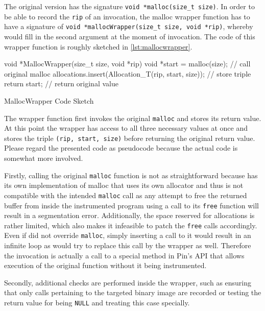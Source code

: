 The original version has the signature \texttt{void *malloc(size_t size)}. In order to be able to
record the \texttt{rip} of an invocation, the malloc wrapper function has to have a signature of 
\texttt{void *mallocWrapper(size_t size, void *rip)}, whereby \pin would fill in the second argument
at the moment of invocation. The code of this wrapper function is roughly sketched in \cref{lst:mallocwrapper}.

\begin{listing}[h]
\centering
\begin{cppcode}
void *MallocWrapper(size_t size, void *rip) {
	void *start = malloc(size); // call original malloc
	allocations.insert(Allocation_T(rip, start, size)); // store triple
	return start; // return original value
}
\end{cppcode}
\caption{MallocWrapper Code Sketch}
\label{lst:mallocwrapper}
\end{listing}

The wrapper function first invokes the original \texttt{malloc} and stores its return value. At this point the
wrapper has access to all three necessary values at once and stores the triple \texttt{(rip, start, size)}
before returning the original return value. Please regard the presented code as pseudocode because the actual
code is somewhat more involved.

Firstly, calling the original \texttt{malloc} function is not as straightforward because \pin has its own
implementation of malloc that uses its own allocator and thus is not compatible with the intended
\texttt{malloc} call as any attempt to free the returned buffer from inside the instrumented program using a
call to its \texttt{free} function will result in a segmentation error. Additionally, the space reserved for
\pin allocations is rather limited, which also makes it infeasible to patch the \texttt{free} calls
accordingly. Even if \pin did not override \texttt{malloc}, simply inserting a call to it would result in an
infinite loop as \pin would try to replace this call by the wrapper as well. Therefore the invocation is
actually a call to a special method in {\small Pin's} API that allows execution of the original function
without it being instrumented.

Secondly, additional checks are performed inside the wrapper, such as ensuring that only calls pertaining to
the targeted binary image are recorded or testing the return value for being \texttt{NULL} and treating this
case specially.

